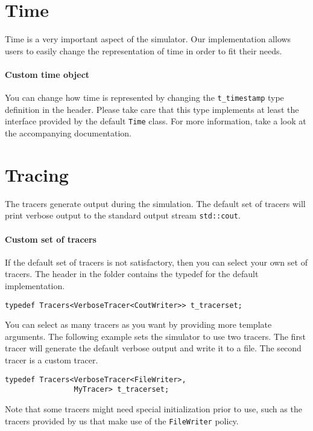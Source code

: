 \lstset{
    frameround=fttt,
    language=C++,
    breaklines=true,
}

\section{Time}
Time is a very important aspect of the simulator. Our implementation allows users to easily change the representation of time in order to fit their needs.
\paragraph{Custom time object}
You can change how time is represented by changing the \lstinline{t_timestamp} type definition in the  header. Please take care that this type implements at least the interface provided by the default \lstinline{Time} class. For more information, take a look at the accompanying documentation.

\section{Tracing}
\label{sec:Tracing}
The tracers generate output during the simulation. The default set of tracers will print verbose output to the standard output stream \lstinline{std::cout}.
\paragraph{Custom set of tracers}
If the default set of tracers is not satisfactory, then you can select your own set of tracers. The header  in the folder  contains the typedef for the default implementation.
\begin{lstlisting}
typedef Tracers<VerboseTracer<CoutWriter>> t_tracerset;
\end{lstlisting}
You can select as many tracers as you want by providing more template arguments. The following example sets the simulator to use two tracers. The first tracer will generate the default verbose output and write it to a file. The second tracer is a custom tracer.
\begin{lstlisting}
typedef Tracers<VerboseTracer<FileWriter>,
                MyTracer> t_tracerset;
\end{lstlisting}
Note that some tracers might need special initialization prior to use, such as the tracers provided by us that make use of the \lstinline{FileWriter} policy.

